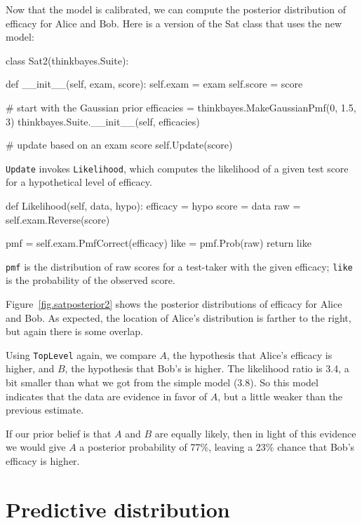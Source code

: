 \documentclass[12pt]{book}
\theoremstyle{exercise}
\begin{document}
Now that the model is calibrated, we can compute the posterior
distribution of efficacy for Alice and Bob.  Here is a version of the
Sat class that uses the new model:

\begin{code}
class Sat2(thinkbayes.Suite):

    def __init__(self, exam, score):
        self.exam = exam
        self.score = score

        # start with the Gaussian prior
        efficacies = thinkbayes.MakeGaussianPmf(0, 1.5, 3)
        thinkbayes.Suite.__init__(self, efficacies)

        # update based on an exam score
        self.Update(score)
\end{code}

\verb"Update" invokes
\verb"Likelihood", which computes the likelihood of a given test score
for a hypothetical level of efficacy.

\begin{code}
    def Likelihood(self, data, hypo):
        efficacy = hypo
        score = data
        raw = self.exam.Reverse(score)

        pmf = self.exam.PmfCorrect(efficacy)
        like = pmf.Prob(raw)
        return like
\end{code}

{\tt pmf} is the distribution of raw scores for a test-taker
with the given efficacy; {\tt like} is the probability of
the observed score.

Figure~\ref{fig.satposterior2} shows the posterior distributions
of efficacy for Alice and Bob.  As expected, the location
of Alice's distribution is farther to the right, but again there
is some overlap.

Using {\tt TopLevel} again, we compare $A$, the
hypothesis that Alice's efficacy is higher, and $B$, the
hypothesis that Bob's is higher.  The likelihood ratio is
3.4, a bit smaller than what we got from the simple model (3.8).
So this model indicates that the data are evidence in favor
of $A$, but a little weaker than the previous estimate.

If our prior belief is that $A$ and $B$ are equally likely,
then in light of this evidence we would give $A$ a posterior
probability of 77\%, leaving a 23\% chance that Bob's efficacy
is higher.


\section{Predictive distribution}
\end{document}
